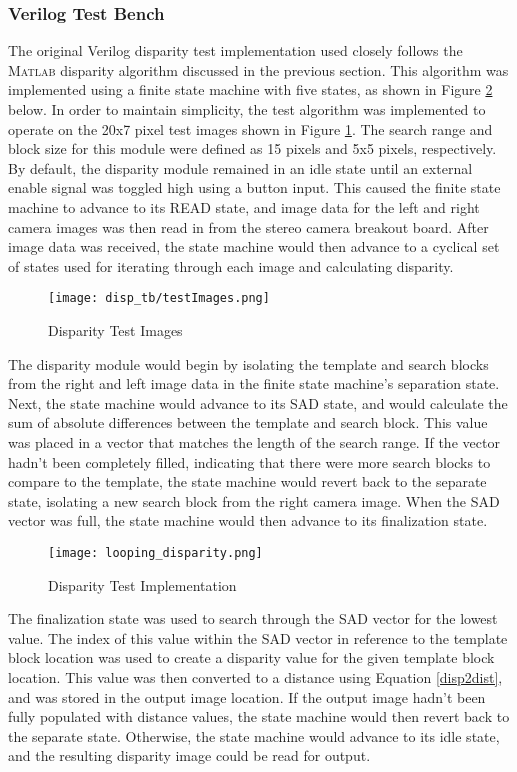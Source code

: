 \subsubsection{Verilog Test Bench}
The original Verilog disparity test implementation used closely follows the \textsc{Matlab} disparity algorithm discussed in the previous section. This algorithm was implemented using a finite state machine with five states, as shown in Figure \ref{disparityTestImp} below. In order to maintain simplicity, the test algorithm was implemented to operate on the 20x7 pixel test images shown in Figure \ref{disparityTestImg}. The search range and block size for this module were defined as 15 pixels and 5x5 pixels, respectively. By default, the disparity module remained in an idle state until an external enable signal was toggled high using a button input. This caused the finite state machine to advance to its READ state, and image data for the left and right camera images was then read in from the stereo camera breakout board. After image data was received, the state machine would then advance to a cyclical set of states used for iterating through each image and calculating disparity. 
\par
\begin{figure}[H]
	\centerline{\texttt{[image: disp\_tb/testImages.png]}}
	\caption{Disparity Test Images}
	\label{disparityTestImg}
\end{figure}
The disparity module would begin by isolating the template and search blocks from the right and left image data in the finite state machine's separation state. Next, the state machine would advance to its SAD state, and would calculate the sum of absolute differences between the template and search block. This value was placed in a vector that matches the length of the search range. If the vector hadn't been completely filled, indicating that there were more search blocks to compare to the template, the state machine would revert back to the separate state, isolating a new search block from the right camera image. When the SAD vector was full, the state machine would then advance to its finalization state. 
\par
\begin{figure}[H]
	\centerline{\texttt{[image: looping\_disparity.png]}}
	\caption{Disparity Test Implementation}
	\label{disparityTestImp}
\end{figure}
\par
The finalization state was used to search through the SAD vector for the lowest value. The index of this value within the SAD vector in reference to the template block location was used to create a disparity value for the given template block location. This value was then converted to a distance using Equation \ref{disp2dist}, and was stored in the output image location. If the output image hadn't been fully populated with distance values, the state machine would then revert back to the separate state. Otherwise, the state machine would advance to its idle state, and the resulting disparity image could be read for output. 
